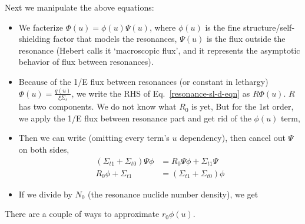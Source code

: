 \documentclass{school-22.211-notes}
\begin{document}
Next we manipulate the above equations:
\begin{itemize}
\item We facterize $\Phi(u) = \phi(u) \Psi(u)$, where $\phi(u)$ is the fine structure/self-shielding factor that models the resonances, $\Psi(u)$ is the flux outside the resonance (Hebert calls it `macroscopic flux', and it represents the asymptotic behavior of flux between resonances). 

\item Because of the 1/E flux between resonances (or constant in lethargy) $\Phi(u) = \frac{q(u)}{\xi \Sigma_s}$, we write the RHS of Eq.~\ref{resonance-sl-d-eqn} as $R \Phi(u)$. $R$ has two components. We do not know what $R_0$ is yet,
But for the 1st order, we apply the 1/E flux between resonance part and get rid of the $\phi(u)$ term, 

\item Then we can write (omitting every term's $u$ dependency), then cancel out $\Psi$ on both sides, 
\begin{align}
 (\Sigma_{t1} + \Sigma_{t0}) \Psi \phi &= R_0 \Psi \phi +  \Sigma_{t1} \Psi    \\
R_0 \phi + \Sigma_{t1} &= (\Sigma_{t1}  + \Sigma_{t0} ) \phi 
\end{align}

\item If we divide by $N_0$ (the resonance nuclide number density), we get 
\end{itemize}


There are a couple of ways to approximate $r_0 \phi(u)$. 
\end{document}

